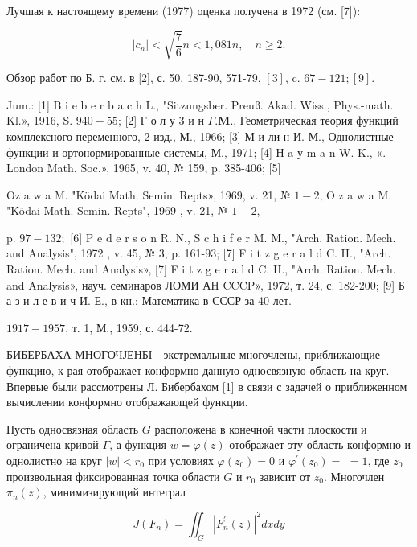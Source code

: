 \documentclass[10pt]{article}
\begin{document}
Лучшая к настоящему времени (1977) оценка получена в 1972 (см. [7]):



\[

\left|c_{n}\right|<\sqrt{\frac{7}{6}} n<1,081 n, \quad n \geqslant 2 .

\]



Обзор работ по Б. г. см. в [2], с. 50, 187-90, 571-79, $[3]$, c. $67-121 ;[9]$.



Jum.: [1] B i e b e r b a c h L., "Sitzungsber. Preuß. Akad. Wiss., Phys.-math. Kl.», 1916, S. $940-55$; [2] Г о л у 3 и н $\Gamma . \mathbf{M}$., Геометрическая теория функций комплексного переменного, 2 изд., М., 1966; [3] М и ли н И. М., Однолистные функции и ортонормированные системы, М., 1971; [4] Н a у m a n W. K., «. London Math. Soc.», 1965, v. 40, № 159, p. 385-406; [5]

$\mathrm{O} \mathrm{z}$ a w a $\mathrm{M}$. "Ködai Math. Semin. Repts», 1969, v. 21, № $1-2$, O z a w a M. "Ködai Math. Semin. Repts", 1969 , v. 21, № $1-2$,

p. $97-132 ;$ [6] P e d e r s o n R. N., S c h i f e r M. M., "Arch. Ration. Mech. and Analysis", 1972 , v. 45, № 3, p. 161-93; [7] F i t z g e r a l d C. H., "Arch. Ration. Mech. and Analysis», [7] F i t z g e r a l d C. H., "Arch. Ration. Mech. and Analysis», науч. семинаров ЛОМИ АH CCCP», 1972, т. 24, с. 182-200; [9] Б а з и л е в и ч И. Е., в кн.: Математика в СССР за 40 лет.

$1917-1957$, т. 1, М., 1959, с. 444-72.



БИБЕРБАХА МНОГОЧЈЕНБІ - экстремальные многочлены, приближающие функцию, к-рая отображает конформно данную односвязную область на круг. Впервые были рассмотрены Л. Бибербахом [1] в связи с задачей о приближенном вычислении конформно отображающей функции.



Пусть односвязная область $G$ расположена в конечной части плоскости и ограничена кривой $\Gamma$, а функция $w=\varphi(z)$ отображает эту область конформно и однолистно на круг $|w|<r_{0}$ при условиях $\varphi\left(z_{0}\right)=0$ и $\varphi^{\prime}\left(z_{0}\right)=$ $=1$, где $z_{0}$ произвольная фиксированная точка области $G$ и $r_{0}$ зависит от $z_{0}$. Многочлен $\pi_{n}(z)$, минимизирующий интеграл



\[

J\left(F_{n}\right)=\iint_{G}\left|F_{n}^{\prime}(z)\right|^{2} d x d y

\]
\end{document}
